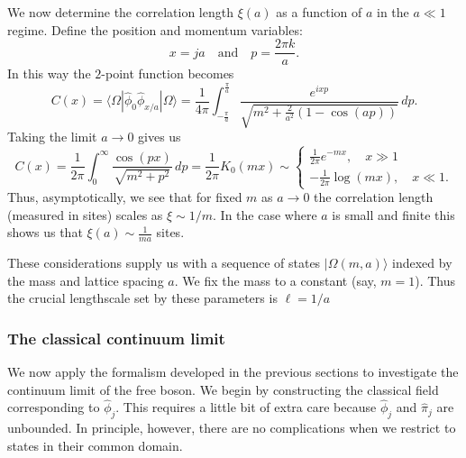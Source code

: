 \documentclass[prl,twocolumn,lengthcheck,superscriptaddress]{revtex4-1}
\theoremstyle{definition}
\theoremstyle{remark}
\begin{document}
We now determine the correlation length $\xi(a)$ as a function of $a$ in the $a \ll 1$ regime. Define the position and momentum variables:
\begin{equation}
	x = ja \quad\text{and}\quad p = \frac{2\pi k}{a}.
\end{equation}
In this way the $2$-point function becomes
\begin{equation}
	C(x) = \langle \Omega|\widehat{\phi}_0\widehat{\phi}_{x/a} |\Omega\rangle = \frac{1}{4\pi}\int_{-\frac{\pi}{a}}^{\frac{\pi}{a}} \frac{e^{i xp}}{\sqrt{m^2 + \frac{2}{a^2}\left(1-\cos(ap)\right)}} \,dp.
\end{equation}
Taking the limit $a\rightarrow 0$ gives us
\begin{equation}
	C(x) = \frac{1}{2\pi}\int_0^\infty \frac{\cos( p x)}{\sqrt{m^2 + p^2}} \, dp = \frac{1}{2\pi}K_0(m x) \sim \begin{cases}\frac{1}{2\pi}e^{-mx}, \quad x \gg 1 \\
	-\frac{1}{2\pi} \log(mx), \quad x \ll 1.\end{cases}
\end{equation}
Thus, asymptotically, we see that for fixed $m$ as $a\rightarrow 0$ the correlation length (measured in sites) scales as $\xi \sim 1/m$. In the case where $a$ is small and finite this shows us that $\xi(a) \sim \frac{1}{ma}$ sites.

These considerations supply us with a sequence of states $|\Omega(m,a)\rangle$ indexed by the mass and lattice spacing $a$. We fix the mass to a constant (say, $m=1$). Thus the crucial lengthscale set by these parameters is $\ell = 1/a$

\subsubsection{The classical continuum limit}
We now apply the formalism developed in the previous sections to investigate the continuum limit of the free boson. We begin by constructing the classical field corresponding to $\widehat{\phi}_j$. This requires a little bit of extra care because $\widehat{\phi}_j$ and $\widehat{\pi}_j$ are unbounded. In principle, however, there are no complications when we restrict to states in their common domain. 
\end{document}
